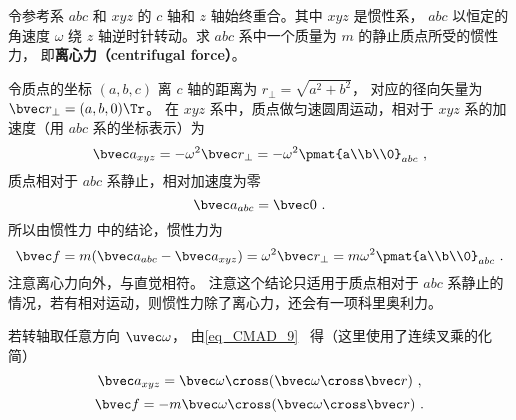 
令参考系 $abc$ 和 $xyz$ 的 $c$ 轴和 $z$ 轴始终重合。其中 $xyz$ 是惯性系， $abc$ 以恒定的角速度 $\omega$ 绕 $z$ 轴逆时针转动。求 $abc$ 系中一个质量为 $m$ 的静止质点所受的惯性力， 即\textbf{离心力（centrifugal force）}。

令质点的坐标 $(a,b,c)$ 离 $c$ 轴的距离为 $r_\bot = \sqrt{a^2 + b^2}$， 对应的径向矢量为 $\bvec r_\bot = (a,b,0)\Tr$。 在 $xyz$ 系中，质点做匀速圆周运动，相对于 $xyz$ 系的加速度（用 $abc$ 系的坐标表示）为
\begin{equation}
\bvec a_{xyz} =  - \omega ^2 \bvec r_\bot =  - \omega ^2 \pmat{a\\b\\0}_{abc}~,
\end{equation}
质点相对于 $abc$ 系静止，相对加速度为零
\begin{equation}
\bvec a_{abc} = \bvec 0~.
\end{equation}
所以由惯性力 中的结论，惯性力为
\begin{equation}\label{eq_Centri_3}
\bvec f = m(\bvec a_{abc} - \bvec a_{xyz}) = \omega^2\bvec r_\bot = m\omega ^2\pmat{a\\b\\0}_{abc}~.
\end{equation}
注意离心力向外，与直觉相符。 注意这个结论只适用于质点相对于 $abc$ 系静止的情况，若有相对运动，则惯性力除了离心力，还会有一项科里奥利力。

若转轴取任意方向 $\uvec\omega$， 由\autoref{eq_CMAD_9}~ 得（这里使用了连续叉乘的化简）
\begin{equation}
\bvec a_{xyz} = \bvec\omega\cross (\bvec\omega\cross\bvec r)~,
\end{equation}
\begin{equation}\label{eq_Centri_5}
\bvec f = -m\bvec\omega\cross (\bvec\omega\cross\bvec r)~.
\end{equation}
